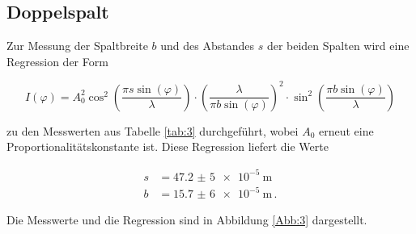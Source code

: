 \newpage

\subsection{Doppelspalt}

Zur Messung der Spaltbreite $b$ und des Abstandes $s$ der beiden Spalten wird eine Regression der Form

\begin{equation}
  I(\varphi) = A_0^2 \cos^2\left( \frac{\pi s \sin (\varphi)}{\lambda} \right) \cdot \left( \frac{\lambda}{\pi b \sin(\varphi)} \right)^2 \cdot \sin^2 \left( \frac{\pi b \sin(\varphi)}{\lambda} \right)
\end{equation}

zu den Messwerten aus Tabelle \ref{tab:3} durchgeführt, wobei $A_0$ erneut eine Proportionalitätskonstante ist. Diese Regression liefert die Werte

\begin{align*}
  s &= \SI{47,2(5)e-5}{\meter} \\
  b &= \SI{15,7(6)e-5}{\meter} \, .
\end{align*}

Die Messwerte und die Regression sind in Abbildung \ref{Abb:3} dargestellt.

